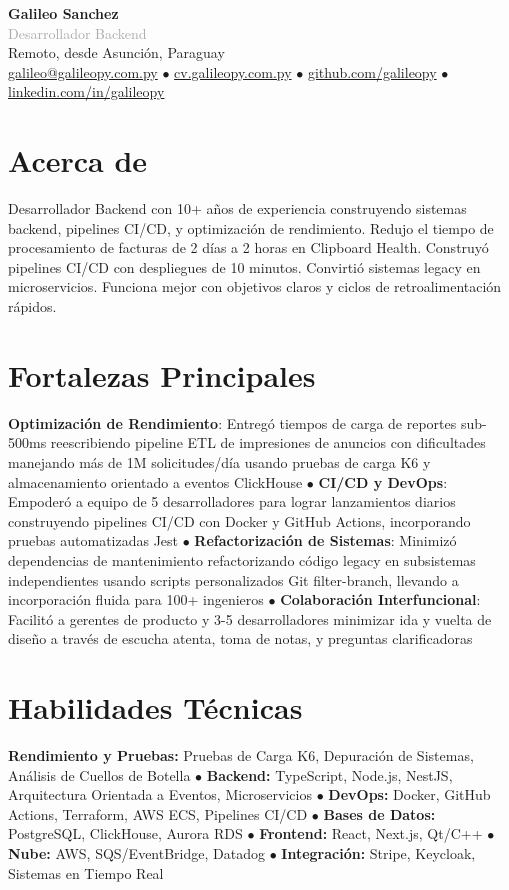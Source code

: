 \documentclass[10pt,a4paper]{article}
\newcommand{\cvheader}[5]{
  \begin{center}
    {\Large \textbf{#1}}\\[0.1em]
    {\normalsize \textcolor{darkgray}{#2}}\\[0.3em]
    
    \footnotesize \textcolor{mediumgray}{#3}\\[0.2em]
    
    \footnotesize
    \href{mailto:#4}{#4} $\bullet$ \href{https://#5}{#5} $\bullet$ 
    \href{https://github.com/galileopy}{github.com/galileopy} $\bullet$ 
    \href{https://www.linkedin.com/in/galileopy}{linkedin.com/in/galileopy}
  \end{center}
  \vspace{0.3em}
}
\begin{document}
\cvheader{Galileo Sanchez}{Desarrollador Backend}{Remoto, desde Asunción, Paraguay}{galileo@galileopy.com.py}{cv.galileopy.com.py}

\section{Acerca de}
{\footnotesize Desarrollador Backend con 10+ años de experiencia construyendo sistemas backend, pipelines CI/CD, y optimización de rendimiento. Redujo el tiempo de procesamiento de facturas de 2 días a 2 horas en Clipboard Health. Construyó pipelines CI/CD con despliegues de 10 minutos. Convirtió sistemas legacy en microservicios. Funciona mejor con objetivos claros y ciclos de retroalimentación rápidos.}

\section{Fortalezas Principales}
{\footnotesize
	\textbf{Optimización de Rendimiento}: Entregó tiempos de carga de reportes sub-500ms reescribiendo pipeline ETL de impresiones de anuncios con dificultades manejando más de 1M solicitudes/día usando pruebas de carga K6 y almacenamiento orientado a eventos ClickHouse $\bullet$ \textbf{CI/CD y DevOps}: Empoderó a equipo de 5 desarrolladores para lograr lanzamientos diarios construyendo pipelines CI/CD con Docker y GitHub Actions, incorporando pruebas automatizadas Jest $\bullet$ \textbf{Refactorización de Sistemas}: Minimizó dependencias de mantenimiento refactorizando código legacy en subsistemas independientes usando scripts personalizados Git filter-branch, llevando a incorporación fluida para 100+ ingenieros $\bullet$ \textbf{Colaboración Interfuncional}: Facilitó a gerentes de producto y 3-5 desarrolladores minimizar ida y vuelta de diseño a través de escucha atenta, toma de notas, y preguntas clarificadoras
}

\section{Habilidades Técnicas}
{\footnotesize
	\textbf{Rendimiento y Pruebas:} Pruebas de Carga K6, Depuración de Sistemas, Análisis de Cuellos de Botella $\bullet$ \textbf{Backend:} TypeScript, Node.js, NestJS, Arquitectura Orientada a Eventos, Microservicios $\bullet$ \textbf{DevOps:} Docker, GitHub Actions, Terraform, AWS ECS, Pipelines CI/CD $\bullet$ \textbf{Bases de Datos:} PostgreSQL, ClickHouse, Aurora RDS $\bullet$ \textbf{Frontend:} React, Next.js, Qt/C++ $\bullet$ \textbf{Nube:} AWS, SQS/EventBridge, Datadog $\bullet$ \textbf{Integración:} Stripe, Keycloak, Sistemas en Tiempo Real
}
\end{document}
